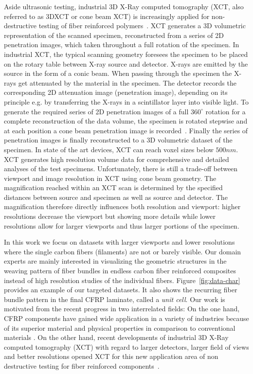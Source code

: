 Aside ultrasonic testing, industrial 3D X-Ray computed tomography (XCT, also referred to as 3DXCT or cone beam XCT) is increasingly applied for non-destructive testing of fiber reinforced polymers~\cite{Kastner2012}. XCT generates a 3D volumetric representation of the scanned specimen, reconstructed from a series of 2D penetration images, which taken throughout a full rotation of the specimen. In industrial XCT, the typical scanning geometry foresees the specimen to be placed on the rotary table between X-ray source and detector. X-rays are emitted by the source in the form of a conic beam. When passing through the specimen the X-rays get attenuated by the material in the specimen. The detector records the corresponding 2D attenuation image (penetration image), depending on its principle e.g. by transferring the X-rays in a scintillator layer into visible light. To generate the required series of 2D penetration images of a full $360^\circ$ rotation for a complete reconstruction of the data volume, the specimen is rotated stepwise and at each position a cone beam penetration image is recorded~\cite{heinzl-2008-thesis}. Finally the series of penetration images is finally reconstructed to a 3D volumetric dataset of the specimen. 
In state of the art devices, XCT can reach voxel sizes below $500 nm$. XCT generates high resolution volume data for comprehensive and detailed analyses of the test specimens. Unfortunately, there is still a trade-off between viewport and image resolution in XCT using cone beam geometry. The magnification reached within an XCT scan is determined by the specified distances between source and specimen as well as source and detector. The magnification therefore directly influences both resolution and viewport: higher resolutions decrease the viewport but showing more details while lower resolutions allow for larger viewports and thus larger portions of the specimen.

In this work we focus on datasets with larger viewports and lower resolutions where the single carbon fibers (filaments) are not or barely visible. Our domain experts are mainly interested in visualizing the geometric structures in the weaving pattern of fiber bundles in endless carbon fiber reinforced composites instead of high resolution studies of the individual fibers.
Figure~\ref{fig:data-char} provides an example of our targeted datasets. It also shows the recurring fiber bundle pattern in the final CFRP laminate, called a \textit{unit cell}.
Our work is motivated from the recent progress in two interrelated fields: On the one hand, CFRP components have gained wide application in a variety of industries  because of its superior material and physical properties in comparison to conventional materials \cite{Karpat2012}. On the other hand, recent developments of industrial 3D X-Ray computed tomography (XCT) with regard to larger detectors, larger field of views and better resolutions opened XCT for this new application area of non destructive testing for fiber reinforced components~\cite{Schilling2005}. 


